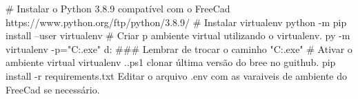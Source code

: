 # Instalar o Python 3.8.9 compatível com o FreeCad
https://www.python.org/ftp/python/3.8.9/
# Instalar virtualenv
python -m pip install --user virtualenv 
# Criar p ambiente virtual utilizando o virtualenv.
py -m virtualenv -p="C:\Users\wmeba\AppData\Local\Programs\Python{}\python.exe" d:\virtualenv 
### Lembrar de trocar o caminho "C:\Users\wmeba\AppData\Local\Programs\Python{}\python.exe"
# Ativar o ambiente virtual virtualenv
.\virtualenv\Scripts\activate.ps1 
clonar última versão do bree no guithub.
pip install -r requirements.txt 
Editar o arquivo .env com as varaiveis de ambiente do FreeCad se necessário.

